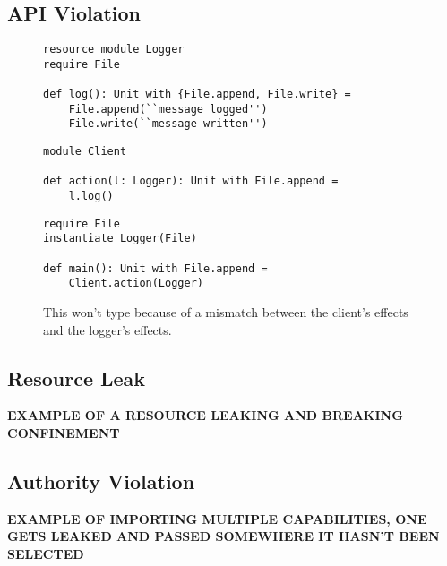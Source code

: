\subsection{API Violation}

\begin{figure}[h]

\begin{lstlisting}
resource module Logger
require File

def log(): Unit with {File.append, File.write} =
    File.append(``message logged'')
    File.write(``message written'')
\end{lstlisting}

\begin{lstlisting}
module Client

def action(l: Logger): Unit with File.append =
    l.log()
\end{lstlisting}

\begin{lstlisting}
require File
instantiate Logger(File)

def main(): Unit with File.append =
    Client.action(Logger)
\end{lstlisting}

\caption{This won't type because of a mismatch between the client's effects and the logger's effects.}
\label{This is the label.}
\end{figure}

\subsection{Resource Leak}

\textbf{EXAMPLE OF A RESOURCE LEAKING AND BREAKING CONFINEMENT}

\subsection{Authority Violation}

\textbf{EXAMPLE OF IMPORTING MULTIPLE CAPABILITIES, ONE GETS LEAKED AND PASSED SOMEWHERE IT HASN'T BEEN SELECTED}
